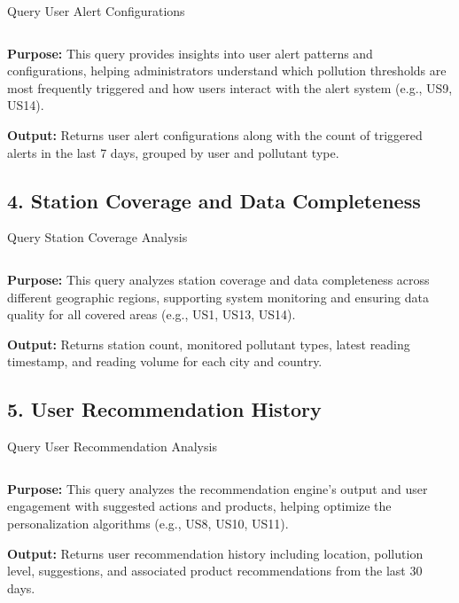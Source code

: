 \begin{listing}[H]
\caption{Query User Alert Configurations}
\label{code:query3}
\inputminted[linenos]{sql}{Codigos/query_3.tex}
\end{listing}

\textbf{Purpose:} This query provides insights into user alert patterns and configurations, helping administrators understand which pollution thresholds are most frequently triggered and how users interact with the alert system (e.g., US9, US14).

\textbf{Output:} Returns user alert configurations along with the count of triggered alerts in the last 7 days, grouped by user and pollutant type.

\subsection*{4. Station Coverage and Data Completeness}

\begin{listing}[H]
\caption{Query Station Coverage Analysis}
\label{code:query4}
\inputminted[linenos]{sql}{Codigos/query_4.tex}
\end{listing}

\textbf{Purpose:} This query analyzes station coverage and data completeness across different geographic regions, supporting system monitoring and ensuring data quality for all covered areas (e.g., US1, US13, US14).

\textbf{Output:} Returns station count, monitored pollutant types, latest reading timestamp, and reading volume for each city and country.

\subsection*{5. User Recommendation History}

\begin{listing}[H]
\caption{Query User Recommendation Analysis}
\label{code:query5}
\inputminted[linenos]{sql}{Codigos/query_5.tex}
\end{listing}

\textbf{Purpose:} This query analyzes the recommendation engine's output and user engagement with suggested actions and products, helping optimize the personalization algorithms (e.g., US8, US10, US11).

\textbf{Output:} Returns user recommendation history including location, pollution level, suggestions, and associated product recommendations from the last 30 days.

\newpage